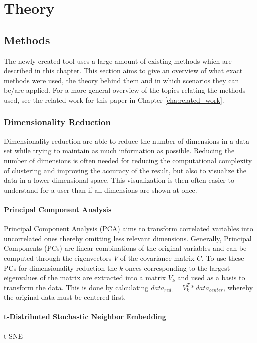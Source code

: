 \documentclass[
	a4paper,
	english,
	twoside,
	openright,               
	11pt                            
	]{report}
\begin{document}
\part{Theory}
\chapter{Methods}
The newly created tool uses a large amount of existing methods which are described in this chapter. This section aims to give an overview of what exact methods were used, the theory behind them and in which scenarios they can be/are applied. For a more general overview of the topics relating the methods used, see the related work for this paper in Chapter \ref{cha:related_work}.

\section{Dimensionality Reduction}\label{sec:dim_reduction}
Dimensionality reduction are able to reduce the number of dimensions in a data-set while trying to maintain as much information as possible. Reducing the number of dimensions is often needed for reducing the computational complexity of clustering and improving the accuracy of the result, but also to visualize the data in a lower-dimensional space. This visualization is then often easier to understand for a user than if all dimensions are shown at once.
\subsection{Principal Component Analysis}
 Principal Component Analysis (PCA) \cite{pca} aims to transform correlated variables into uncorrelated ones thereby omitting less relevant dimensions. Generally, Principal Components (PCs) are linear combinations of the original variables and can be computed through the eigenvectors $V$ of the covariance matrix $C$. To use these PCs for dimensionality reduction the $k$ onces corresponding to the largest eigenvalues of the matrix are extracted into a matrix $V_k$ and used as a basis to transform the data. This is done by calculating $data_{red.}=V_k^T*data_{center}$, whereby the original data must be centered first.

\subsection{t-Distributed Stochastic Neighbor Embedding}
 t-SNE \cite{Maaten2008VisualizingDU}
\end{document}
